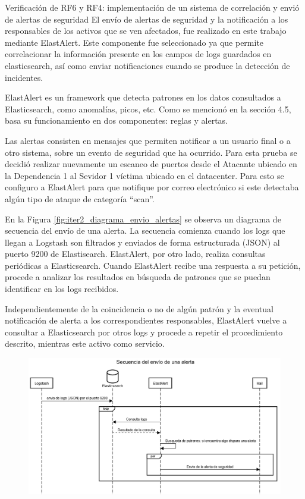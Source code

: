     \begin{section}{Verificación de RF6 y RF4: implementación de un sistema de correlación y envió de alertas de seguridad}
    El envío de alertas de seguridad y la notificación a los responsables de los activos que se ven afectados, fue realizado en este trabajo mediante ElastAlert. Este componente fue seleccionado ya que permite correlacionar la información presente en los campos de logs guardados en elasticsearch, así como enviar notificaciones cuando se produce la detección de incidentes. \par
    ElastAlert es un framework que detecta patrones en los datos consultados a Elasticsearch, como anomalías, picos, etc. Como se mencionó en la sección 4.5, basa su funcionamiento en dos componentes: reglas y alertas. \par
    Las alertas consisten en mensajes que permiten notificar a un usuario final o a otro sistema, sobre un evento de seguridad que ha ocurrido. Para esta prueba se decidió realizar nuevamente un escaneo de puertos desde el Atacante ubicado en la Dependencia 1 al Sevidor 1 víctima ubicado en el datacenter. Para esto se configuro a ElastAlert para que notifique por correo electrónico si este detectaba algún tipo de ataque de categoría “scan”.\par
     En la Figura \ref{fig:iter2_diagrama_envio_alertas} se observa un diagrama de secuencia del envío de una alerta.
    La secuencia comienza cuando los logs que llegan a Logstash son filtrados y enviados de forma estructurada (JSON) al puerto 9200 de Elastisearch. ElastAlert, por otro lado, realiza consultas periódicas a Elasticsearch. Cuando ElastAlert recibe una respuesta a su petición, procede a analizar los resultados en búsqueda de patrones que se puedan identificar en los logs recibidos. \par
    Independientemente de la coincidencia o no de algún patrón y la eventual notificación de alerta a los correspondientes responsables, ElastAlert vuelve a consultar a Elasticsearch por otros logs y procede a repetir el procedimiento descrito, mientras este activo como servicio.\par
    \begin{figure}[H]
    \centering
        \includegraphics[width=1\textwidth]{./iteracion_2_imagenes/2-diagrama-de-secuencia-envio-alerta.png}

\end{figure}
\end{section}
